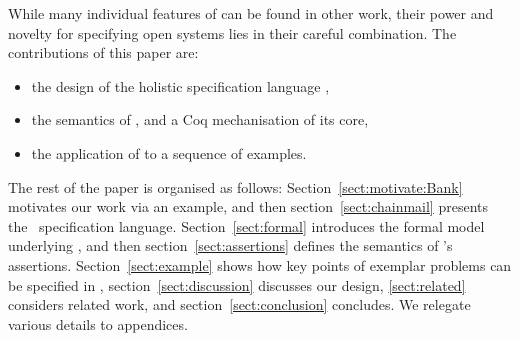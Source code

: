 
While many individual features of \Chainmail can be found in other work, 
their power and novelty for specifying open systems lies in their careful combination.
The contributions of this paper are:
\begin{itemize}
\item the design of the holistic specification language \Chainmail,
\item the semantics of \Chainmail, and a Coq mechanisation of its core,
\item the application of \Chainmail  to a sequence of examples.
\end{itemize}  
  
  
The rest of the paper is organised as follows: Section~\ref{sect:motivate:Bank} 
motivates our work via an example, and then
section~\ref{sect:chainmail} presents the \Chainmail\ specification
language.  Section~\ref{sect:formal} introduces the formal model
underlying \Chainmail, and then section~\ref{sect:assertions} defines
the 
semantics of \Chainmail's assertions.
Section~\ref{sect:example} shows how key points of 
exemplar problems can be specified in \Chainmail,
section~\ref{sect:discussion}
discusses our design, \ref{sect:related} considers related
work, and section~\ref{sect:conclusion} concludes.
We relegate various details to appendices.
